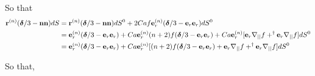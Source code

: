 So that 
\begin{align}
    \textbf{r}^{(n)}(\bm\delta/3 - \textbf{nn}) dS
    &= 
    \textbf{r}^{(n)}(\bm\delta/3 - \textbf{nn}) dS^0 
    + 2 Ca f \textbf{e}^{(n)}_r(\bm\delta/3 - \textbf{e}_r \textbf{e}_r)  dS^0 \\
    &=
    \textbf{e}_r^{(n)}(\bm\delta/3
    - \textbf{e}_r\textbf{e}_r)
    + Ca  \textbf{e}_r^{(n)} (n+2) f (\bm\delta/3 - \textbf{e}_r\textbf{e}_r)
    + Ca \textbf{e}_r^{(n)} [
        \textbf{e}_r \mathbf{\nabla}_{||} f
        + ^\dagger \textbf{e}_r \mathbf{\nabla}_{||} f
    ] dS^0 \\
    &=
    \textbf{e}_r^{(n)}(\bm\delta/3
    - \textbf{e}_r\textbf{e}_r)
    + Ca \textbf{e}_r^{(n)}
    [(n+2) f (\bm\delta/3 - \textbf{e}_r\textbf{e}_r)
    + \textbf{e}_r \mathbf{\nabla}_{||} f
    + ^\dagger \textbf{e}_r \mathbf{\nabla}_{||} f
    ] dS^0 \\
\end{align}


So that,

